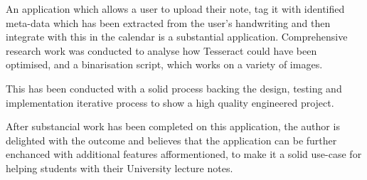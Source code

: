 An application which allows a user to upload their note, tag it with identified meta-data which has been extracted from the user's handwriting and then integrate with this in the calendar is a substantial application. Comprehensive research work was conducted to analyse how Tesseract could have been optimised, and a binarisation script, which works on a variety of images.

This has been conducted with a solid process backing the design, testing and implementation iterative process to show a high quality engineered project.

After substancial work has been completed on this application, the author is delighted with the outcome and believes that the application can be further enchanced with additional features afformentioned, to make it a solid use-case for helping students with their University lecture notes.

